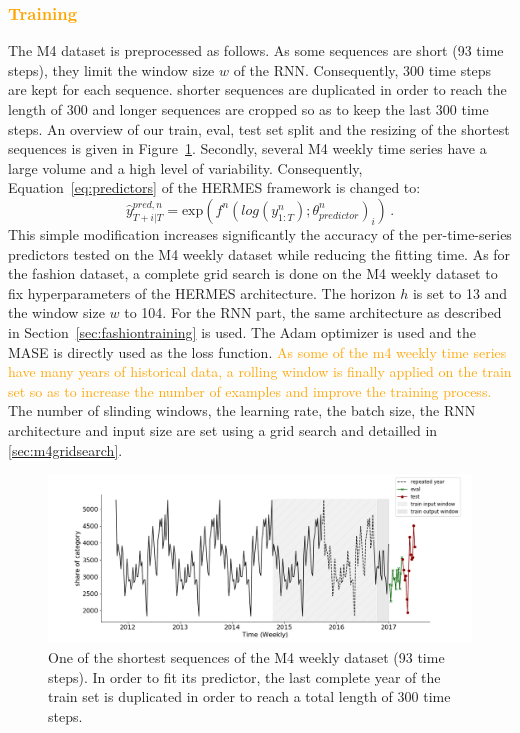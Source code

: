 \documentclass[10pt]{article} %
\newcommand{\ts}{y}
\newcommand{\tspred}{\widehat{\ts}}
\newcommand{\stat}{f}
\newcommand{\statparam}{\theta_{predictor}}
\begin{document}
\textcolor{orange}{\subsubsection{Training}}
The M4 dataset is preprocessed as follows. As some sequences are short (93 time steps), they limit the window size $w$ of the RNN.  
Consequently, 300 time steps are kept for each sequence. shorter sequences are duplicated in order to reach the length of 300 and longer sequences are cropped so as to keep the last 300 time steps. An overview of our train, eval, test set split and the resizing of the shortest sequences is given in Figure~\ref{fig:m4dataset}. Secondly, several M4 weekly time series have a large volume and a high level of variability. Consequently, Equation~\ref{eq:predictors} of the HERMES framework is changed to:
\begin{equation}
    \tspred^{pred,n}_{T+i|T} =\mbox{exp}\left( \stat^n(log\left(\ts^n_{1:T}\right);\statparam^n)_i\right)\,.
\end{equation}
This simple modification increases significantly the accuracy of the per-time-series predictors tested on the M4 weekly dataset while reducing the fitting time. As for the fashion dataset, a complete grid search is done on the M4 weekly dataset to fix hyperparameters of the HERMES architecture. The horizon $h$ is set to 13 and the window size $w$ to 104. For the RNN part, the same architecture as described in Section~\ref{sec:fashiontraining} is used. The Adam optimizer is used and the MASE is directly used as the loss function. \textcolor{orange}{As some of the m4 weekly time series have many years of historical data, a rolling window is finally applied on the train set so as to increase the number of examples and improve the training process.} The number of slinding windows, the learning rate, the batch size, the RNN architecture and input size are set using a grid search and detailled in \ref{sec:m4gridsearch}.

\begin{figure}
  \centering
    \includegraphics[width=1.\linewidth]{m4_dataset}
  \caption{One of the shortest sequences of the M4 weekly dataset (93 time steps). In order to fit its predictor, the last complete year of the train set is duplicated in order to reach a total length of 300 time steps.}
\label{fig:m4dataset}
\end{figure}
\end{document}
